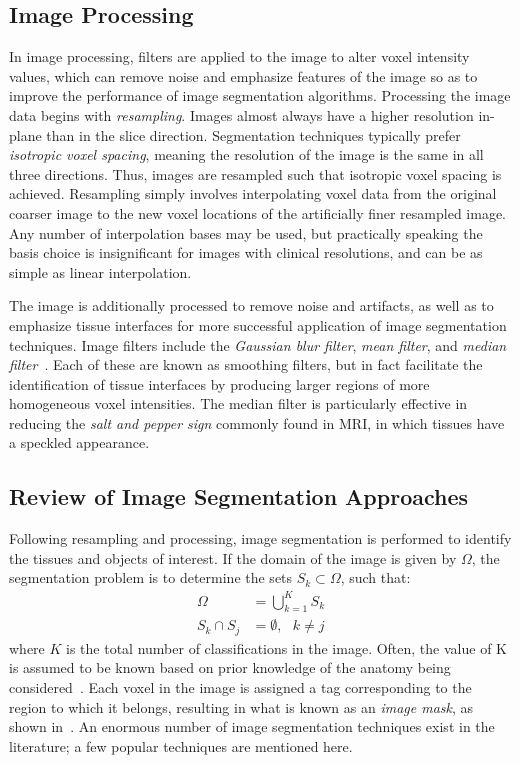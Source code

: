 \subsection{Image Processing}
\label{Image Processing}
In image processing, filters are applied to the image to alter voxel intensity values, which can remove noise and emphasize features of the image so as to improve the performance of image segmentation algorithms. Processing the image data begins with \textit{resampling}. Images almost always have a higher resolution in-plane than in the slice direction. Segmentation techniques typically prefer \textit{isotropic voxel spacing}, meaning the resolution of the image is the same in all three directions. Thus, images are resampled such that isotropic voxel spacing is achieved. Resampling simply involves interpolating voxel data from the original coarser image to the new voxel locations of the artificially finer resampled image. Any number of interpolation bases may be used, but practically speaking the basis choice is insignificant for images with clinical resolutions, and can be as simple as linear interpolation.

The image is additionally processed to remove noise and artifacts, as well as to emphasize tissue interfaces for more successful application of image segmentation techniques. Image filters include the \textit{Gaussian blur filter}, \textit{mean filter}, and \textit{median filter}~\cite{Seg3D}. Each of these are known as smoothing filters, but in fact facilitate the identification of tissue interfaces by producing larger regions of more homogeneous voxel intensities. The median filter is particularly effective in reducing the \textit{salt and pepper sign} commonly found in MRI, in which tissues have a speckled appearance.

\subsection{Review of Image Segmentation Approaches}
\label{Review of Image Segmentation Approaches}

Following resampling and processing, image segmentation is performed to identify the tissues and objects of interest. If the domain of the image is given by $\Omega$, the segmentation problem is to determine the sets $S_k \subset \Omega$, such that:
\begin{align}
\Omega &= \bigcup \limits_{k=1}^{K} S_k \\
S_k \cap S_j &= \emptyset, \text{\ \ } k \neq j
\end{align}
where $K$ is the total number of classifications in the image. Often, the value of K is assumed to be known based on prior knowledge of the anatomy being considered~\cite{pham_2000}. Each voxel in the image is assigned a tag corresponding to the region to which it belongs, resulting in what is known as an \textit{image mask}, as shown in~. An enormous number of image segmentation techniques exist in the literature; a few popular techniques are mentioned here.


